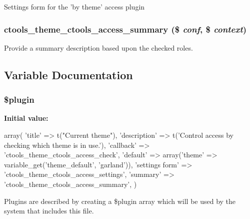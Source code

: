 Settings form for the 'by theme' access plugin \hypertarget{profiles_2dosomething_2modules_2contrib_2ctools_2plugins_2access_2theme_8inc_a84b5a26f3810000d996117a936fd5737}{
\subsubsection[{ctools\_\-theme\_\-ctools\_\-access\_\-summary}]{\setlength{\rightskip}{0pt plus 5cm}ctools\_\-theme\_\-ctools\_\-access\_\-summary (\$ {\em conf}, \/  \$ {\em context})}}
\label{profiles_2dosomething_2modules_2contrib_2ctools_2plugins_2access_2theme_8inc_a84b5a26f3810000d996117a936fd5737}
Provide a summary description based upon the checked roles. 

\subsection{Variable Documentation}
\hypertarget{profiles_2dosomething_2modules_2contrib_2ctools_2plugins_2access_2theme_8inc_ada8a7130088351710bb02ed622d6bf65}{
\subsubsection[{\$plugin}]{\setlength{\rightskip}{0pt plus 5cm}\$plugin}}
\label{profiles_2dosomething_2modules_2contrib_2ctools_2plugins_2access_2theme_8inc_ada8a7130088351710bb02ed622d6bf65}
{\bfseries Initial value:}
\begin{DoxyCode}
 array(
  'title' => t("Current theme"),
  'description' => t('Control access by checking which theme is in use.'),
  'callback' => 'ctools_theme_ctools_access_check',
  'default' => array('theme' => variable_get('theme_default', 'garland')),
  'settings form' => 'ctools_theme_ctools_access_settings',
  'summary' => 'ctools_theme_ctools_access_summary',
)
\end{DoxyCode}
Plugins are described by creating a \$plugin array which will be used by the system that includes this file. 